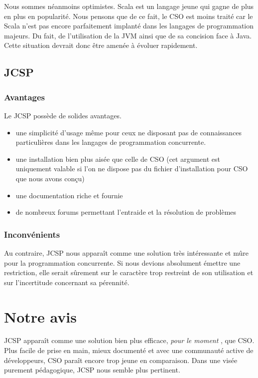 \documentclass[a4paper,11pt,french]{report}
\begin{document}
Nous sommes néanmoins optimistes.  Scala est un langage jeune qui gagne de plus en plus en popularité. Nous pensons que de ce fait, le CSO est moins traité car le Scala n'est pas encore parfaitement implanté dans les langages de programmation majeurs. Du fait, de l'utilisation de la JVM ainsi que de sa concision face à Java. Cette situation devrait donc être amenée à évoluer rapidement.

\subsection{JCSP}
\subsubsection{Avantages}
Le JCSP possède de solides avantages. 
\begin{itemize}
\item une simplicité d'usage m\^eme pour ceux ne disposant pas de connaissances particulières dans les langages de programmation concurrente.
\item une installation bien plus aisée que celle de CSO (cet argument est uniquement valable si l'on ne dispose pas du fichier d'installation pour CSO que nous avons conçu)
\item une documentation riche et fournie
\item de nombreux forums permettant l'entraide et la résolution de problèmes
\end{itemize}

\subsubsection{Inconvénients}
Au contraire, JCSP nous appara\^it comme une solution très intéressante et m\^ure pour la programmation concurrente. Si nous devions absolument émettre une restriction, elle serait s\^urement sur le caractère trop restreint de son utilisation et sur l'incertitude concernant sa pérennité.

\section{Notre avis}
JCSP appara\^it comme une solution bien plus efficace, \textit{pour le moment} , que CSO. Plus facile de prise en main, mieux documenté et avec une communauté active de développeurs, CSO para\^it encore trop jeune en comparaison. Dans une visée purement pédagogique, JCSP nous semble plus pertinent. 
\end{document}
